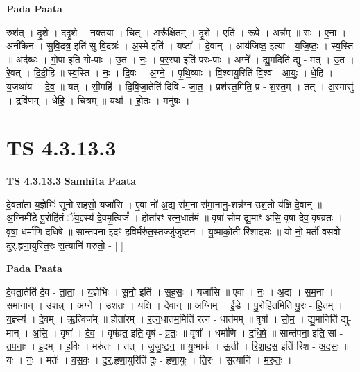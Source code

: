 \documentclass[17pt]{extarticle}
\begin{document}
\textbf{Pada Paata} \newline

रुश॑त् । दृ॒शे । द॒दृ॒शे॒ । न॒क्त॒या । चि॒त् । अरू᳚क्षितम् । दृ॒शे । एति॑ । रू॒पे । अन्न᳚म् ॥ सः । ए॒ना । अनी॑केन । सु॒वि॒दत्र॒ इति॑ सु-वि॒दत्रः॑ । अ॒स्मे इति॑ । यष्टा᳚ । दे॒वान् । आय॑जिष्ठ॒ इत्या - य॒जि॒ष्ठः॒ । स्व॒स्ति ॥ अद॑ब्धः । गो॒पा इति गो-पाः । उ॒त । नः॒ । प॒र॒स्पा इति॑ परः-पाः । अग्ने᳚ । द्यु॒मदिति॑ द्यु - मत् । उ॒त । रे॒वत् । दि॒दी॒हि॒ ॥ स्व॒स्ति । नः॒ । दि॒वः । अ॒ग्ने॒ । पृ॒थि॒व्याः । वि॒श्वायु॒रिति॑ वि॒श्व - आ॒युः॒ । धे॒हि॒ । य॒जथा॑य । दे॒व॒ ॥ यत् । सी॒महि॑ । दि॒वि॒जा॒तेति॑ दिवि - जा॒त॒ । प्रश॑स्त॒मिति॒ प्र - श॒स्त॒म् । तत् । अ॒स्मासु॑ । द्रवि॑णम् । धे॒हि॒ । चि॒त्रम् ॥ यथा᳚ । हो॒तः॒ । मनु॑षः ।  \newline




\section*{ TS 4.3.13.3 }

\textbf{TS 4.3.13.3 } \newline
\textbf{Samhita Paata} \newline

दे॒वता॑ता य॒ज्ञेभिः॑ सूनो सहसो॒ यजा॑सि । ए॒वा नो॑ अ॒द्य स॑म॒ना स॑मा॒नानु॒-शन्न॑ग्न उश॒तो य॑क्षि दे॒वान् ॥ अ॒ग्निमी॑डे पु॒रोहि॑तं ॅय॒ज्ञ्स्य॑ दे॒वमृ॒त्विजं᳚ । होता॑रꣳ रत्न॒धात॑मं ॥ वृषा॑ सोम द्यु॒माꣳ अ॑सि॒ वृषा॑ देव॒ वृष॑व्रतः । वृषा॒ धर्मा॑णि दधिषे ॥ सान्त॑पना इ॒दꣳ ह॒विर्मरु॑त॒स्तज्जु॑जुष्टन । यु॒ष्माको॒ती रि॑शादसः ॥ यो नो॒ मर्तो॑ वसवो दुर्.हृणा॒युस्ति॒रः स॒त्यानि॑ मरुतो॒ - [  ] \newline

\textbf{Pada Paata} \newline

दे॒वता॒तेति॑ दे॒व - ता॒ता॒ । य॒ज्ञेभिः॑ । सू॒नो॒ इति॑ । स॒ह॒सः॒ । यजा॑सि ॥ ए॒वा । नः॒ । अ॒द्य । स॒म॒ना । स॒मा॒नान् । उ॒शन्न् । अ॒ग्ने॒ । उ॒श॒तः । य॒क्षि॒ । दे॒वान् ॥ अ॒ग्निम् । ई॒डे॒ । पु॒रोहि॑त॒मिति॑ पु॒रः - हि॒त॒म् । य॒ज्ञ्स्य॑ । दे॒वम् । ऋ॒त्विज᳚म् ॥ होता॑रम् । र॒त्न॒धात॑म॒मिति॑ रत्न - धात॑मम् ॥ वृषा᳚ । सो॒म॒ । द्यु॒मानिति॑ द्यु-मान् । अ॒सि॒ । वृषा᳚ । दे॒व॒ । वृष॑व्रत॒ इति॒ वृष॑ - व्र॒तः॒ ॥ वृषा᳚ । धर्मा॑णि । द॒धि॒षे॒ ॥ सान्त॑पना॒ इति॒ सां - त॒प॒नाः॒ । इ॒दम् । ह॒विः । मरु॑तः । तत् । जु॒जु॒ष्ट॒न॒ ॥ यु॒ष्माक॑ । ऊ॒ती । रि॒शा॒द॒स॒ इति॑ रिश - अ॒द॒सः॒ ॥ यः । नः॒ । मर्तः॑ । व॒स॒वः॒ । दु॒र्॒.हृ॒णा॒युरिति॑ दुः - हृ॒णा॒युः । ति॒रः । स॒त्यानि॑ । म॒रु॒तः॒ ।  \newline
\end{document}
